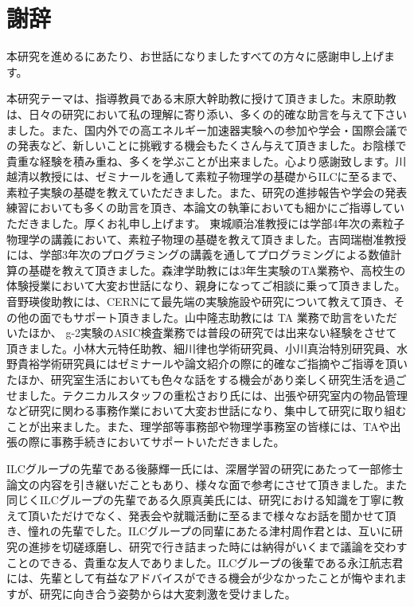 
\clearpage

\chapter*{謝辞} \label{sec:Acknowledgement}
本研究を進めるにあたり、お世話になりましたすべての方々に感謝申し上げます。

本研究テーマは、指導教員である末原大幹助教に授けて頂きました。末原助教は、日々の研究において私の理解に寄り添い、多くの的確な助言を与えて下さいました。また、国内外での高エネルギー加速器実験への参加や学会・国際会議での発表など、新しいことに挑戦する機会もたくさん与えて頂きました。お陰様で貴重な経験を積み重ね、多くを学ぶことが出来ました。心より感謝致します。川越清以教授には、ゼミナールを通して素粒子物理学の基礎からILCに至るまで、素粒子実験の基礎を教えていただきました。また、研究の進捗報告や学会の発表練習においても多くの助言を頂き、本論文の執筆においても細かにご指導していただきました。厚くお礼申し上げます。
東城順治准教授には学部4年次の素粒子物理学の講義において、素粒子物理の基礎を教えて頂きました。吉岡瑞樹准教授には、学部3年次のプログラミングの講義を通してプログラミングによる数値計算の基礎を教えて頂きました。森津学助教には3年生実験のTA業務や、高校生の体験授業において大変お世話になり、親身になってご相談に乗って頂きました。音野瑛俊助教には、CERNにて最先端の実験施設や研究について教えて頂き、その他の面でもサポート頂きました。山中隆志助教には TA 業務で助言をいただいたほか、 g-2実験のASIC検査業務では普段の研究では出来ない経験をさせて頂きました。小林大元特任助教、細川律也学術研究員、小川真治特別研究員、水野貴裕学術研究員にはゼミナールや論文紹介の際に的確なご指摘やご指導を頂いたほか、研究室生活においても色々な話をする機会があり楽しく研究生活を過ごせました。テクニカルスタッフの重松さおり氏には、出張や研究室内の物品管理など研究に関わる事務作業において大変お世話になり、集中して研究に取り組むことが出来ました。また、理学部等事務部や物理学事務室の皆様には、TAや出張の際に事務手続きにおいてサポートいただきました。

ILCグループの先輩である後藤輝一氏には、深層学習の研究にあたって一部修士論文の内容を引き継いだこともあり、様々な面で参考にさせて頂きました。また同じくILCグループの先輩である久原真美氏には、研究における知識を丁寧に教えて頂いただけでなく、発表会や就職活動に至るまで様々なお話を聞かせて頂き、憧れの先輩でした。ILCグループの同輩にあたる津村周作君とは、互いに研究の進捗を切磋琢磨し、研究で行き詰まった時には納得がいくまで議論を交わすことのできる、貴重な友人でありました。ILCグループの後輩である永江航志君には、先輩として有益なアドバイスができる機会が少なかったことが悔やまれますが、研究に向き合う姿勢からは大変刺激を受けました。

